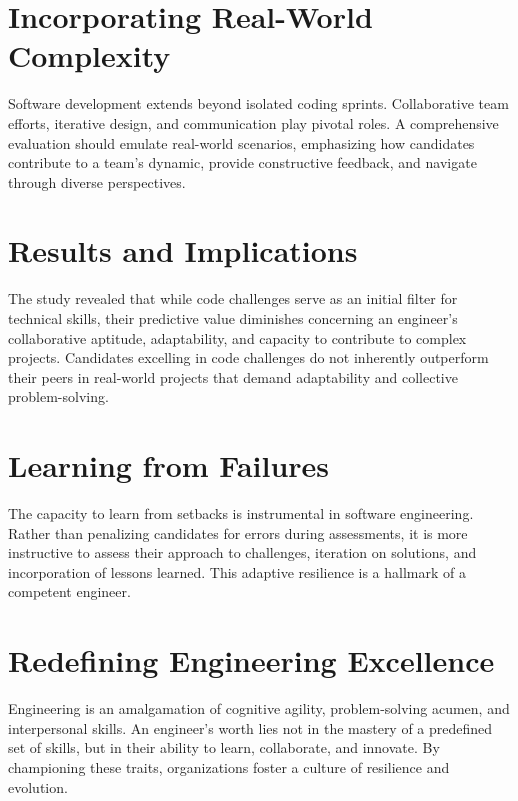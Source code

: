 \documentclass[
    a4paper, %
    10pt, %
    unnumberedsections, %
    twoside, %
]{LTJournalArticle}
\begin{document}
\section{Incorporating Real-World Complexity}

Software development extends beyond isolated coding sprints. Collaborative team efforts, iterative design, and communication play pivotal roles. A comprehensive evaluation should emulate real-world scenarios, emphasizing how candidates contribute to a team's dynamic, provide constructive feedback, and navigate through diverse perspectives.


\section{Results and Implications}

The study revealed that while code challenges serve as an initial filter for technical skills, their predictive value diminishes concerning an engineer's collaborative aptitude, adaptability, and capacity to contribute to complex projects. Candidates excelling in code challenges do not inherently outperform their peers in real-world projects that demand adaptability and collective problem-solving.

\section{Learning from Failures}

The capacity to learn from setbacks is instrumental in software engineering. Rather than penalizing candidates for errors during assessments, it is more instructive to assess their approach to challenges, iteration on solutions, and incorporation of lessons learned. This adaptive resilience is a hallmark of a competent engineer.


\section{Redefining Engineering Excellence}

Engineering is an amalgamation of cognitive agility, problem-solving acumen, and interpersonal skills. An engineer's worth lies not in the mastery of a predefined set of skills, but in their ability to learn, collaborate, and innovate. By championing these traits, organizations foster a culture of resilience and evolution.
\end{document}
